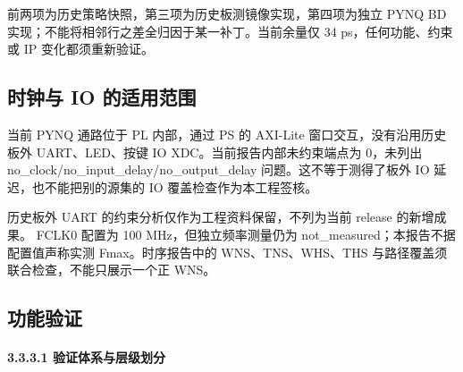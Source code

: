 前两项为历史策略快照，第三项为历史板测镜像实现，第四项为独立 PYNQ BD 实现；不能将相邻行之差全归因于某一补丁。当前余量仅 34 ps，任何功能、约束或 IP 变化都须重新验证。


\Needspace{85pt}

\subsection{时钟与 IO 的适用范围}\label{ux65f6ux949fux4e0e-io-ux7684ux9002ux7528ux8303ux56f4}

当前 PYNQ 通路位于 PL 内部，通过 PS 的 AXI-Lite 窗口交互，没有沿用历史板外 UART、LED、按键 IO XDC。当前报告内部未约束端点为 0，未列出 no\_clock/no\_input\_delay/no\_output\_delay 问题。这不等于测得了板外 IO 延迟，也不能把别的源集的 IO 覆盖检查作为本工程签核。

历史板外 UART 的约束分析仅作为工程资料保留，不列为当前 release 的新增成果。 FCLK0 配置为 100 MHz，但独立频率测量仍为 not\_measured；本报告不据配置值声称实测 Fmax。时序报告中的 WNS、TNS、WHS、THS 与路径覆盖须联合检查，不能只展示一个正 WNS。

\Needspace{85pt}

\subsection{功能验证}

\Needspace{85pt}

\paragraph{3.3.3.1 验证体系与层级划分}

